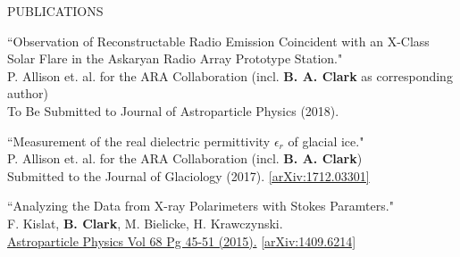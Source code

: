 \documentclass{resume} %
\begin{document}
\begin{rSection}{PUBLICATIONS}
\begin{etaremune}%
 \item ``Observation of Reconstructable Radio Emission Coincident with an X-Class Solar Flare in the Askaryan Radio Array Prototype Station." \\
 P. Allison et. al. for the ARA Collaboration (incl. \textbf{B. A. Clark} as corresponding author) \\
 To Be Submitted to Journal of Astroparticle Physics (2018).
  \item ``Measurement of the real dielectric permittivity $\epsilon_r$ of glacial ice." \\
 P. Allison et. al. for the ARA Collaboration (incl. \textbf{B. A. Clark}) \\
 Submitted to the Journal of Glaciology (2017). \href{https://arxiv.org/abs/1712.03301}{[arXiv:1712.03301]}
   \item ``Analyzing the Data from X-ray Polarimeters with Stokes Paramters." \\
 F. Kislat,  \textbf{B. Clark}, M. Bielicke, H. Krawczynski.  \\
  \href{http://dx.doi.org/10.1016/j.astropartphys.2015.02.007}{Astroparticle Physics Vol 68 Pg 45-51 (2015).} \href{https://arxiv.org/abs/1409.6214}{[arXiv:1409.6214]} 
 \end{etaremune}
\end{rSection}

\end{document}
